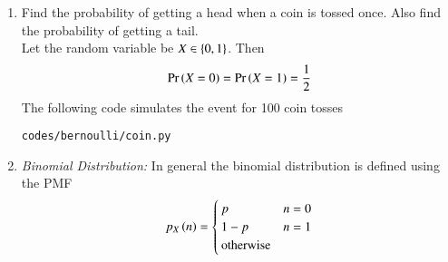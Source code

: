 \renewcommand{\theequation}{\theenumi}
\renewcommand{\thefigure}{\theenumi}
\begin{enumerate}[label=\thesubsection.\arabic*.,ref=\thesubsection.\theenumi]
%
\item Find the probability of getting a head when a coin is tossed once. Also
find the probability of getting a tail.
\\
\solution  
Let the random variable be $X\in \left\{0,1\right\}$.  Then
\begin{align}
\Pr\left(X=0\right)=\Pr\left(X=1\right)=\frac{1}{2}
\end{align}
The following code simulates the event for 100 coin tosses
\begin{lstlisting}
codes/bernoulli/coin.py
\end{lstlisting}
\item {\em Binomial Distribution: }  In general the binomial distribution is defined using the PMF
\begin{align}
p_{X}\left(n\right) 
= 
\begin{cases}
p & n = 0
\\
1-p & n = 1
\\
\text{otherwise}
\end{cases}
\end{align}


\end{enumerate}
